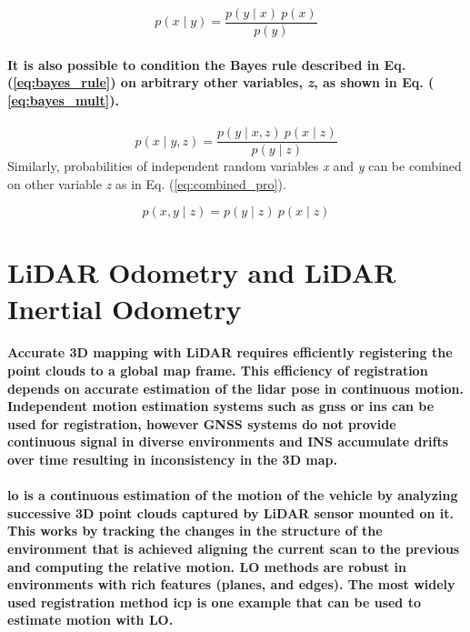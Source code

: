 \begin{equation}
p(x\mid y) = \frac{p(y\mid x)\ p(x)}{p(y)}
	\label{eq:bayes_rule}
\end{equation}

\paragraph{\textnormal{It is also possible to condition the Bayes rule described in Eq. (\ref{eq:bayes_rule}) on arbitrary other variables, \textit{z}, as shown in Eq. ( \ref{eq:bayes_mult}}).}


\begin{equation}
	p(x\mid y, z) = \frac{p(y\mid x, z)\ p(x \mid z)}{p(y \mid z)}
	\label{eq:bayes_mult}
\end{equation}
Similarly, probabilities of independent random variables \textit{x} and \textit{y} can be combined on other variable \textit{z} as in Eq. (\ref{eq:combined_pro}). 

\begin{equation}
	p(x, y\mid z) = p(y\mid z)\ p(x \mid z)
	\label{eq:combined_pro}
\end{equation}
\section{LiDAR Odometry and LiDAR Inertial Odometry}
\paragraph{\textnormal{Accurate 3D mapping with LiDAR requires efficiently registering the point clouds to a global map frame\cite{zhang2024lidar}. This efficiency of registration depends on accurate estimation of the \gls{lidar} pose in continuous motion. Independent motion estimation systems such as \gls{gnss} or \gls{ins} can be used for registration, however GNSS systems do not provide continuous signal in diverse environments and INS accumulate drifts over time resulting in inconsistency in the 3D map. }}

\paragraph{\textnormal{\gls{lo} is a continuous estimation of the motion of the vehicle by analyzing successive 3D point clouds captured by LiDAR sensor mounted on it. This works by tracking the changes in the structure of the environment that is achieved aligning the current scan to the previous and computing the relative motion. LO methods are robust in environments with rich features (planes, and edges). The most widely used registration method \gls{icp} is one example that can be used to estimate motion with LO.}}

